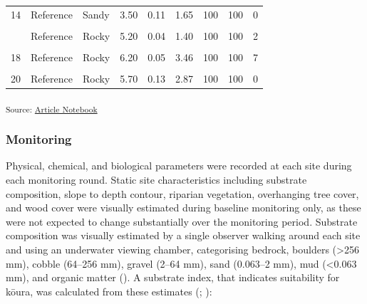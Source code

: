 \documentclass[
  letterpaper,
  DIV=11,
  numbers=noendperiod]{scrartcl}
\begin{document}
\begin{longtable}[t]{rllrrrrrr}
14 & Reference & Sandy & 3.50 & 0.11 & 1.65 & 100 & 100 & 0\\
\cellcolor{gray!8}{15} & \cellcolor{gray!8}{Reference} & \cellcolor{gray!8}{Rocky} & \cellcolor{gray!8}{5.20} & \cellcolor{gray!8}{0.03} & \cellcolor{gray!8}{1.44} & \cellcolor{gray!8}{100} & \cellcolor{gray!8}{100} & \cellcolor{gray!8}{6}\\
\addlinespace
16 & Reference & Rocky & 5.20 & 0.04 & 1.40 & 100 & 100 & 2\\
\cellcolor{gray!8}{17} & \cellcolor{gray!8}{Reference} & \cellcolor{gray!8}{Rocky} & \cellcolor{gray!8}{5.00} & \cellcolor{gray!8}{0.05} & \cellcolor{gray!8}{3.47} & \cellcolor{gray!8}{100} & \cellcolor{gray!8}{100} & \cellcolor{gray!8}{30}\\
18 & Reference & Rocky & 6.20 & 0.05 & 3.46 & 100 & 100 & 7\\
\cellcolor{gray!8}{19} & \cellcolor{gray!8}{Reference} & \cellcolor{gray!8}{Rocky} & \cellcolor{gray!8}{5.70} & \cellcolor{gray!8}{0.11} & \cellcolor{gray!8}{2.63} & \cellcolor{gray!8}{100} & \cellcolor{gray!8}{100} & \cellcolor{gray!8}{4}\\
20 & Reference & Rocky & 5.70 & 0.13 & 2.87 & 100 & 100 & 0\\
\bottomrule

\end{longtable}

\endgroup{}

\textsubscript{Source:
\href{https://OlivierRaven.github.io/Reefs_Rotoiti/index.qmd.html}{Article
Notebook}}

\subsubsection{Monitoring}\label{monitoring}

Physical, chemical, and biological parameters were recorded at each site
during each monitoring round. Static site characteristics including
substrate composition, slope to depth contour, riparian vegetation,
overhanging tree cover, and wood cover were visually estimated during
baseline monitoring only, as these were not expected to change
substantially over the monitoring period. Substrate composition was
visually estimated by a single observer walking around each site and
using an underwater viewing chamber, categorising bedrock, boulders
(\textgreater256 mm), cobble (64--256 mm), gravel (2--64 mm), sand
(0.063--2 mm), mud (\textless0.063 mm), and organic matter
(). A substrate index, that
indicates suitability for kōura, was calculated from these estimates
(;
):
\end{document}
